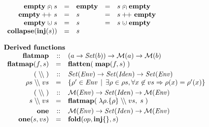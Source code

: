 \begin{figure}
$$\begin{array}{l}
\begin{array}{rclcl}
     \vmempty \vmseq   s & = & \vmempty & = & s \vmseq \vmempty \\
     \vmempty \vmcat   s & = & s        & = & s \vmcat \vmempty \\
     \vmempty \vmunion s & = & s        & = & s \vmunion \vmempty \\
     \vmcollapse(\vminject(s)) & = & s \\
  \end{array}
\\ \\
  \textbf{Derived functions} \\
  \begin{array}{rcl}
    \vmflatmap & :: & (a \rightarrow \powerset{b}) \rightarrow \Vm{a} \rightarrow \Vm{b} \\
    \vmflatmap(f,s) & = & \vmflatten(\; \vmmap( f, s ) \; ) \\[1mm]
    (\ENVhide) & :: & \powerset{\Env} \rightarrow \powerset{\Ident} \rightarrow \powerset{\Env} \\
    \rho{}s \ENVhide vs & = & \{ \rho' \in \Env \vb \exists \rho \in \rho{}s, \forall x \not\in vs \Rightarrow \rho(x) = \rho'(x) \} \\[1mm]
    (\vmhide) & :: & \Vm{\Env} \rightarrow \powerset{\Ident} \rightarrow \Vm{\Env} \\
    s \vmhide vs & = & \vmflatmap (\; \lambda \rho. \{ \rho \} \ENVhide vs, \;s\; ) \\[1mm]
    \vmone & :: & \Vm{\Env} \rightarrow \powerset{\Ident} \rightarrow \Vm{\Env} \\
    \vmone( s, vs ) & = & \vmfold( op, \vminject\{\}, s ) \\

\end{array}
\end{array}$$
\end{figure}
